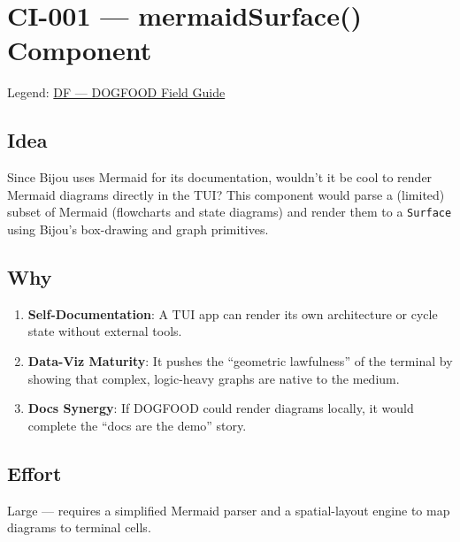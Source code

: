 \chapter{CI-001 --- mermaidSurface() Component}\label{record-285}

\smallskip

Legend: \href{https://github.com/flyingrobots/bijou/blob/cbd70612140e7a450d764b3c7be1c6af878b99bc/docs/method/graveyard/legends/DF-dogfood-field-guide.md}{DF --- DOGFOOD Field Guide}

\section{Idea}\label{record-285-idea}

Since Bijou uses Mermaid for its documentation, wouldn't it be cool to render Mermaid diagrams directly in the TUI? This component would parse a (limited) subset of Mermaid (flowcharts and state diagrams) and render them to a \texttt{S\allowbreak{}u\allowbreak{}r\allowbreak{}f\allowbreak{}a\allowbreak{}c\allowbreak{}e} using Bijou's box-drawing and graph primitives.

\section{Why}\label{record-285-why}

\begin{enumerate}
\def\labelenumi{\arabic{enumi}.}
\tightlist
\item
  \textbf{Self-Documentation}: A TUI app can render its own architecture or cycle state without external tools.
\item
  \textbf{Data-Viz Maturity}: It pushes the ``geometric lawfulness'' of the terminal by showing that complex, logic-heavy graphs are native to the medium.
\item
  \textbf{Docs Synergy}: If DOGFOOD could render diagrams locally, it would complete the ``docs are the demo'' story.
\end{enumerate}

\section{Effort}\label{record-285-effort}

Large --- requires a simplified Mermaid parser and a spatial-layout engine to map diagrams to terminal cells.

